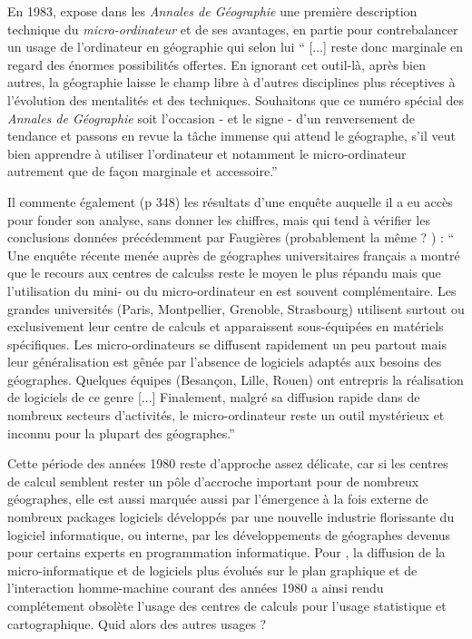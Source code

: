 En 1983, \textcite[367]{Lecarpentier1983} expose dans les \textit{Annales de Géographie} une première description technique du \textit{micro-ordinateur} et de ses avantages, en partie pour contrebalancer un usage de l'ordinateur en géographie qui selon lui \enquote{ [...] reste donc marginale en regard des énormes possibilités offertes. En ignorant cet outil-là, après bien autres, la géographie laisse le champ libre à d'autres disciplines plus réceptives à l'évolution des mentalités et des techniques. Souhaitons que ce numéro spécial des \textit{Annales de Géographie} soit l'occasion - et le signe - d'un renversement de tendance et passons en revue la tâche immense qui attend le géographe, s'il veut bien apprendre à utiliser l'ordinateur et notamment le micro-ordinateur autrement que de façon marginale et accessoire.}

Il commente également (p 348) les résultats d'une enquête auquelle il a eu accès pour fonder son analyse, sans donner les chiffres, mais qui tend à vérifier les conclusions données précédemment par Faugières (probablement la même ? ) : \enquote{ Une enquête récente menée auprès de géographes universitaires français a montré que le recours aux centres de calculss reste le moyen le plus répandu mais que l'utilisation du mini- ou du micro-ordinateur en est souvent complémentaire. Les grandes universités (Paris, Montpellier,  Grenoble, Strasbourg) utilisent surtout ou exclusivement leur centre de calculs et apparaissent sous-équipées en matériels spécifiques. Les micro-ordinateurs se diffusent rapidement un peu partout mais leur généralisation est gênée par l'absence de logiciels adaptés aux besoins des géographes. Quelques équipes (Besançon, Lille, Rouen) ont entrepris la réalisation de logiciels de ce genre [...] Finalement, malgré sa diffusion rapide dans de nombreux secteurs d'activités, le micro-ordinateur reste un outil mystérieux et inconnu pour la plupart des géographes.}

Cette période des années 1980 reste d'approche assez délicate, car si les centres de calcul semblent rester un pôle d'accroche important pour de nombreux géographes, elle est aussi marquée aussi par l’émergence à la fois externe de nombreux packages logiciels développés par une nouvelle industrie florissante du logiciel informatique, ou interne, par les développements de géographes devenus pour certains experts en programmation informatique. Pour \autocites[444]{Joliveau2004}{Waniez2010}, la diffusion de la micro-informatique et de logiciels plus évolués sur le plan graphique et de l’interaction homme-machine courant des années 1980 a ainsi rendu complétement obsolète l’usage des centres de calculs pour l’usage statistique et cartographique. Quid alors des autres usages ?

